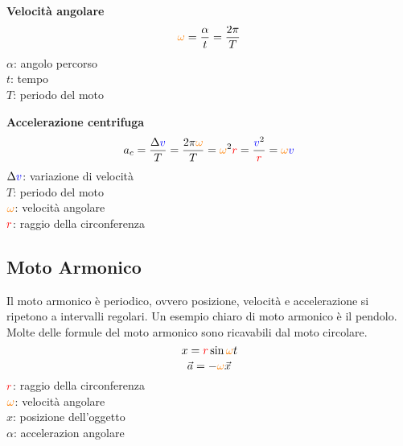 \textbf{Velocità angolare}
\begin{equation*}
\mathcolor{orange}{\omega} = \frac{\alpha}{t} = \frac{2\pi}{T}
\end{equation*}
$\alpha$: angolo percorso\\ 
$t$: tempo\\
$T$: periodo del moto

\textbf{Accelerazione centrifuga}
\begin{equation*}
a_c = \frac{\Delta \mathcolor{blue}{v}}{T} = \frac{2\pi\mathcolor{orange}{\omega}}{T} = 
\mathcolor{orange}{\omega}^2\mathcolor{red}{r} = \frac{\mathcolor{blue}{v}^2}{\mathcolor{red}{r}} = 
\mathcolor{orange}{\omega}\mathcolor{blue}{v}
\end{equation*}
$\Delta\mathcolor{blue}{v}$: variazione di velocità\\
$T$: periodo del moto\\
$\mathcolor{orange}{\omega}$: velocità angolare\\
$\mathcolor{red}{r}$: raggio della circonferenza

\subsection{Moto Armonico}
Il moto armonico è periodico, ovvero posizione, velocità e accelerazione si ripetono a intervalli 
regolari. Un esempio chiaro di moto armonico è il pendolo.\\
Molte delle formule del moto armonico sono ricavabili dal moto circolare.
\begin{equation*}
x = \mathcolor{red}{r}\sin\mathcolor{orange}{\omega}t
\end{equation*}
\begin{equation*}
\vec{a} = -\mathcolor{orange}{\omega}\vec{x}
\end{equation*}
$\mathcolor{red}{r}$: raggio della circonferenza\\
$\mathcolor{orange}{\omega}$: velocità angolare\\
$x$: posizione dell'oggetto\\
$\alpha$: accelerazion angolare

